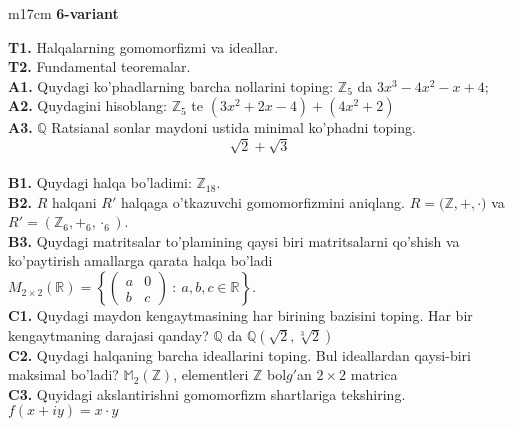\documentclass{article}
\begin{document}
\begin{tabular}{m{17cm}}
\textbf{6-variant}
\newline

\textbf{T1.} Halqalarning gomomorfizmi va ideallar. \\
\textbf{T2.} Fundamental teoremalar. \\
\textbf{A1.} Quydagi ko'phadlarning barcha nollarini toping:
\(\mathbb{Z}_{5}\) da \(3x^{3} - 4x^{2} - x + 4\); \\
\textbf{A2.} Quydagini hisoblang:
\(\mathbb{Z}_{5}\) te \(\left( 3x^{2} + 2x - 4 \right) + \left( 4x^{2} + 2 \right)\) \\
\textbf{A3.} \(\mathbb{Q}\) Ratsianal sonlar maydoni ustida minimal ko'phadni toping.
\[\sqrt{2} + \sqrt{3}\] \\
\textbf{B1.} Quydagi halqa bo'ladimi:
\(\mathbb{Z}_{18}\). \\
\textbf{B2.} \(R\) halqani \(R'\) halqaga o'tkazuvchi gomomorfizmini aniqlang.
\(R\mathbb{= (Z,} + , \cdot )\) va \(R' = (\mathbb{Z}_{6}, +_{6}, \cdot_{6})\). \\
\textbf{B3.} Quydagi matritsalar to'plamining qaysi biri matritsalarni qo'shish va ko'paytirish amallarga qarata halqa bo'ladi
\(M_{2 \times 2}\mathbb{(R) =}\left\{ \begin{pmatrix}
a & 0 \\
b & c
\end{pmatrix}\ :\ a,b,c \in \mathbb{R} \right\}\). \\
\textbf{C1.} Quydagi maydon kengaytmasining har birining bazisini toping. Har bir kengaytmaning darajasi qanday?
\(\mathbb{Q}\) da \(\mathbb{Q}\left( \sqrt{2},\sqrt[3]{2} \right)\) \\
\textbf{C2.} Quydagi halqaning barcha ideallarini toping. Bul ideallardan qaysi-biri maksimal bo'ladi?
\(\mathbb{M}_{2}\left( \mathbb{Z} \right)\), elementleri \(\mathbb{Z}\) bol\(g'\)an \(2 \times 2\) matrica \\
\textbf{C3.} Quyidagi akslantirishni gomomorfizm shartlariga tekshiring. \(f(x + iy) = x \cdot y\) \\

\end{tabular}
\vspace{1cm}
\end{document}
